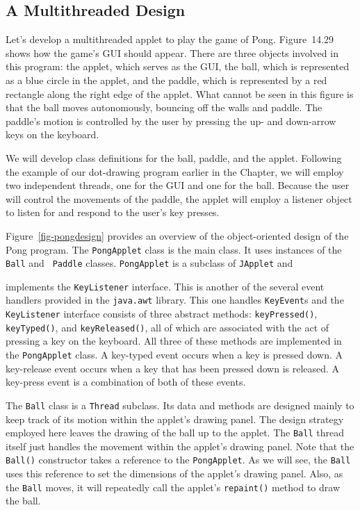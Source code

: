 \subsection{A Multithreaded Design}

Let's develop a multithreaded applet to play the game of Pong.
Figure~14.29 shows how the game's GUI should appear.  There
are three objects involved in this program: the applet, which serves
as the GUI, the ball, which is represented as a blue circle in the
applet, and the paddle, which is represented by a red rectangle along
the right edge of the applet. What cannot be seen in this figure is 
that the ball moves autonomously, bouncing off the walls and paddle.
The paddle's motion is controlled by the user by pressing the up- and
down-arrow keys on the keyboard. 

We will develop class definitions for the ball, paddle, and the
applet. Following the example of our dot-drawing program earlier in
the Chapter, we will employ two independent threads, one for the GUI
and one for the ball.  Because the user will control the movements of
the paddle, the applet will employ a listener object to listen for and
respond to the user's key presses. 

Figure~\ref{fig-pongdesign} provides an overview of the
object-oriented design of the Pong program. The {\tt PongApplet} class
is the main class. It uses instances of the {\tt Ball} and {\tt
Paddle} classes.  {\tt PongApplet} is a subclass of {\tt JApplet} and
\begin{figure}[h!]
\end{figure}
implements the {\tt KeyListener} interface. This is another of the
several event handlers provided in the {\tt java.awt} library. This
one handles {\tt KeyEvent}s and the {\tt KeyListener} interface
consists of three abstract methods: {\tt keyPressed()}, {\tt
keyTyped()}, and {\tt keyReleased()}, all of which are associated with
the act of pressing a key on the keyboard. All three of these
methods are implemented in the {\tt PongApplet} class.  A key-typed
event occurs when a key is pressed down. A key-release event occurs
when a key that has been pressed down is released.  A key-press event
is a combination of both of these events.

The {\tt Ball} class is a {\tt Thread} subclass. Its data and methods
are designed mainly to keep track of its motion within the applet's
drawing panel. The design strategy employed here leaves the drawing of
the ball up to the applet. The {\tt Ball} thread itself just 
handles the movement within the applet's drawing panel.  Note that the {\tt
Ball()} constructor takes a reference to the {\tt PongApplet}. As we
will see, the {\tt Ball} uses this reference to set the dimensions of
the applet's drawing panel. Also, as the {\tt Ball} moves, it will
repeatedly call the applet's {\tt repaint()} method to draw the ball.

